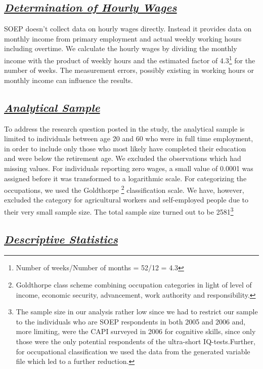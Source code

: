\documentclass[11pt, a4paper, leqno]{article}
\begin{document}
\subsection*{\textit{\underline{Determination of Hourly Wages }}}

SOEP doesn’t collect data on hourly wages directly. Instead it provides data on monthly income from primary employment and actual weekly working hours including overtime. We calculate the hourly wages by dividing the monthly income with the product of weekly hours and the estimated factor of 4.3\footnote{Number of weeks/Number of months = 52/12 = 4.3} for the number of weeks. The measurement errors, possibly existing in working hours or monthly income can influence the results. 

\subsection*{\textit{\underline{Analytical Sample}}}

To address the research question posted in the study, the analytical sample is limited to individuals between age 20 and 60  who were in full time employment, in order to include only those who most likely have completed their education and were below the retirement age. We excluded the observations which had missing values. For individuals reporting zero wages, a small value of 0.0001 was assigned before it was transformed to a logarithmic scale. For categorizing the occupations, we used the  Goldthorpe \footnote{ Goldthorpe class scheme combining occupation categories in light of level of income, economic security, advancement, work authority and responsibility.  
} classification scale.  We have, however,  excluded the category for  agricultural workers and self-employed people due to their very small sample size. The total sample size turned out to be 2581\footnote{The sample size in our analysis rather low since we had to restrict our sample to the  individuals who are SOEP respondents in both 2005 and 2006 and, more limiting, were the CAPI surveyed in 2006 for cognitive skills, since only those were the only potential respondents of the ultra-short IQ-tests.Further, for occupational classification we used the data from the generated variable file which led to a further reduction.}

\subsection*{\textit{\underline{Descriptive Statistics}}}
\end{document}
